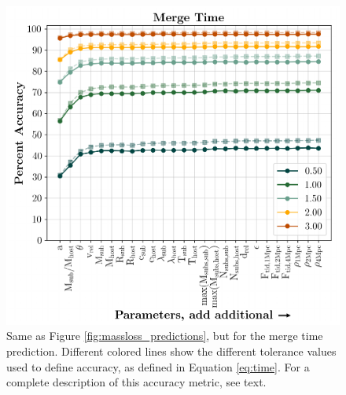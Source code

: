 \documentclass[fleqn,usenatbib]{mnras}
\begin{document}
\begin{figure}
	\includegraphics[width=\columnwidth]{Figures/time_predictions}
	\vspace{-15pt}
    \caption{Same as Figure \ref{fig:massloss_predictions}, but for the merge time prediction. Different colored lines show the different tolerance values used to define accuracy, as defined in Equation \ref{eq:time}. For a complete description of this accuracy metric, see text.}
    \label{fig:time_predictions}
\end{figure}
\end{document}
